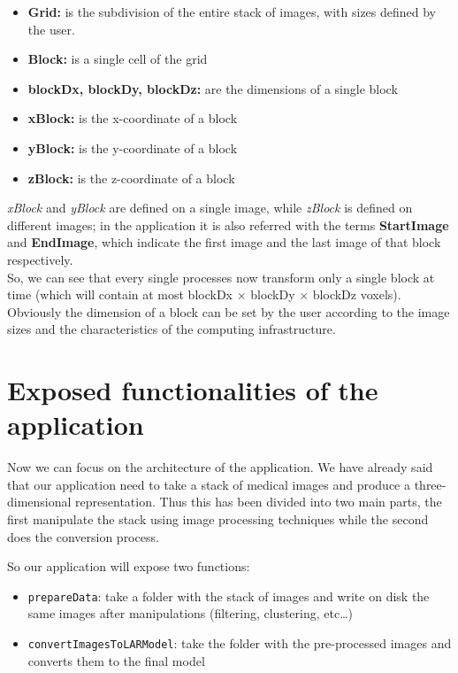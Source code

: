 \begin{itemize}
 \item \textbf{Grid:} is the subdivision of the entire stack of images, with sizes defined by the user.
 \item \textbf{Block:} is a single cell of the grid
 \item \textbf{blockDx, blockDy, blockDz:} are the dimensions of a single block
 \item \textbf{xBlock:} is the x-coordinate of a block
 \item \textbf{yBlock:} is the y-coordinate of a block
 \item \textbf{zBlock:} is the z-coordinate of a block
\end{itemize}

\textit{xBlock} and \textit{yBlock} are defined on a single image, while \textit{zBlock} is defined on different images; in the application it is also referred with the terms \textbf{StartImage} and \textbf{EndImage}, which indicate the first image and the last image of that block respectively.\\

So, we can see that every single processes now transform only a single block at time (which will contain at most blockDx $\times$ blockDy $\times$ blockDz voxels). Obviously the dimension of a block can be set by the user according to the image sizes and the characteristics of the computing infrastructure.

\section{Exposed functionalities of the application}\label{sec31:Functionalities}

Now we can focus on the architecture of the application. We have already said that our application need to take a stack of medical images and produce a three-dimensional representation. Thus this has been divided into two main parts, the first manipulate the stack using image processing techniques while the second does the conversion process.

So our application will expose two functions:
\begin{itemize}
 \item \texttt{prepareData}: take a folder with the stack of images and write on disk the same images after manipulations (filtering, clustering, etc\dots)
 \item \texttt{convertImagesToLARModel}: take the folder with the pre-processed images and converts them to the final model
\end{itemize}

